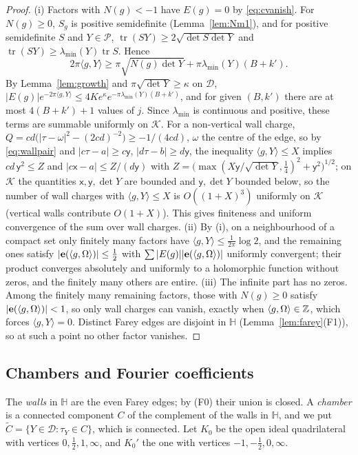 \begin{proof}
(i) Factors with $N(g)<-1$ have $E(g)=0$ by \eqref{eq:cvanish}. For $N(g)\ge0$, $S_g$ is positive semidefinite (Lemma~\ref{lem:Nm1}), and for positive semidefinite $S$ and $Y\in\mathcal P$, $\operatorname{tr}(SY)\ge2\sqrt{\det S\det Y}$ and $\operatorname{tr}(SY)\ge\lambda_{\min}(Y)\operatorname{tr}S$. Hence
\[
2\pi\langle g,Y\rangle\ge\pi\sqrt{N(g)\det Y}+\pi\lambda_{\min}(Y)(B+k').
\]
By Lemma~\ref{lem:growth} and $\pi\sqrt{\det Y}\ge\kappa$ on $\mathcal D$, $|E(g)|e^{-2\pi\langle g,Y\rangle}\le4Ke^{\kappa}e^{-\pi\lambda_{\min}(Y)(B+k')}$, and for given $(B,k')$ there are at most $4(B+k')+1$ values of $j$. Since $\lambda_{\min}$ is continuous and positive, these terms are summable uniformly on $\mathcal K$. For a non-vertical wall charge, $Q=cd\big(|\tau-\omega|^2-(2cd)^{-2}\big)\ge-1/(4cd)$, $\omega$ the centre of the edge, so by \eqref{eq:wallpair} and $|c\tau-a|\ge c\mathsf y$, $|d\tau-b|\ge d\mathsf y$, the inequality $\langle g,Y\rangle\le X$ implies $cd\,\mathsf y^2\le Z$ and $|c\mathsf x-a|\le Z/(d\mathsf y)$ with $Z=\big(\max(X\mathsf y/\sqrt{\det Y},\frac14)^2+\mathsf y^2\big)^{1/2}$; on $\mathcal K$ the quantities $\mathsf x,\mathsf y,\det Y$ are bounded and $\mathsf y,\det Y$ bounded below, so the number of wall charges with $\langle g,Y\rangle\le X$ is $O((1+X)^3)$ uniformly on $\mathcal K$ (vertical walls contribute $O(1+X)$). This gives finiteness and uniform convergence of the sum over wall charges.
(ii) By (i), on a neighbourhood of a compact set only finitely many factors have $\langle g,Y\rangle\le\frac{1}{2\pi}\log2$, and the remaining ones satisfy $|\mathbf e(\langle g,\Omega\rangle)|\le\frac12$ with $\sum|E(g)||\mathbf e(\langle g,\Omega\rangle)|$ uniformly convergent; their product converges absolutely and uniformly to a holomorphic function without zeros, and the finitely many others are entire. (iii) The infinite part has no zeros. Among the finitely many remaining factors, those with $N(g)\ge0$ satisfy $|\mathbf e(\langle g,\Omega\rangle)|<1$, so only wall charges can vanish, exactly when $\langle g,\Omega\rangle\in\mathbb{Z}$, which forces $\langle g,Y\rangle=0$. Distinct Farey edges are disjoint in $\mathbb H$ (Lemma~\ref{lem:farey}(F1)), so at such a point no other factor vanishes.
\end{proof}

\subsection{Chambers and Fourier coefficients}
The \emph{walls} in $\mathbb H$ are the even Farey edges; by (F0) their union is closed. A \emph{chamber} is a connected component $C$ of the complement of the walls in $\mathbb H$, and we put $\tilde C=\{Y\in\mathcal D:\tau_Y\in C\}$, which is connected. Let $K_0$ be the open ideal quadrilateral with vertices $0,\frac12,1,\infty$, and $K_0'$ the one with vertices $-1,-\frac12,0,\infty$.

